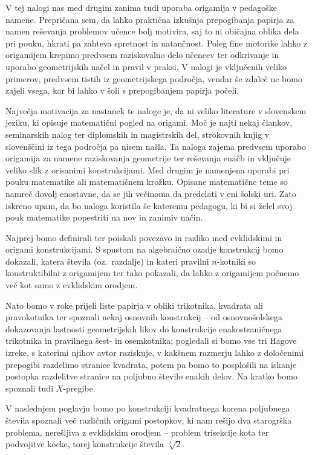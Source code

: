 V tej nalogi nas med drugim zanima tudi uporaba origamija v pedagoške namene. Prepričana sem, da lahko praktična izkušnja prepogibanja papirja za namen reševanja problemov učence bolj motivira, saj to ni običajna oblika dela pri pouku, hkrati pa zahteva spretnost in natančnost. Poleg fine motorike lahko z origamijem krepimo predvsem raziskovalno delo učencev ter odkrivanje in uporabo geometrijskih načel in pravil v praksi. V nalogi je vključenih veliko primerov, predvsem tistih iz geometrijskega področja, vendar še zdaleč ne bomo zajeli vsega, kar bi lahko v šoli s prepogibanjem papirja počeli.

Največja motivacija za nastanek te naloge je, da ni veliko literature v slovenskem jeziku, ki opisuje matematični pogled na origami. Moč je najti nekaj člankov, seminarskih nalog ter diplomskih in magistrskih del, strokovnih knjig v slovenščini iz tega področja pa nisem našla. Ta naloga zajema predvsem uporabo origamija za namene raziskovanja geometrije ter reševanja enačb in vključuje veliko slik z orisanimi konstrukcijami. Med drugim je namenjena uporabi pri pouku matematike ali matematičnem krožku. Opisane matematične teme so namreč dovolj enostavne, da se jih večinoma da predelati v eni šolski uri. Zato iskreno upam, da bo naloga koristila še kateremu pedagogu, ki bi si želel svoj pouk matematike popestriti na nov in zanimiv način.

Najprej bomo definirali ter poiskali povezavo in razliko med evklidskimi in origami konstrukcijami. S spustom na algebraično ozadje konstrukcij bomo dokazali, katera števila (oz.\ razdalje) in kateri pravilni $n$-kotniki so konstruktibilni z origamijem ter tako pokazali, da lahko z origamijem počnemo več kot samo z evklidskim orodjem.

Nato bomo v roke prijeli liste papirja v obliki trikotnika, kvadrata ali pravokotnika ter spoznali nekaj osnovnih konstrukcij -- od osnovnošolskega dokazovanja lastnosti geometrijskih likov do konstrukcije enakostraničnega trikotnika in pravilnega šest- in osemkotnika; pogledali si bomo vse tri Hagove izreke, s katerimi njihov avtor raziskuje, v kakšnem razmerju lahko z določenimi prepogibi razdelimo stranice kvadrata, potem pa bomo to posplošili na iskanje postopka razdelitve stranice na poljubno število enakih delov. Na kratko bomo spoznali tudi $X$-pregibe.

V naslednjem poglavju bomo po konstrukciji kvadratnega korena poljubnega števila spoznali več različnih origami postopkov, ki nam rešijo dva starogrška problema, nerešljiva z evklidskim orodjem -- problem trisekcije kota ter podvojitve kocke, torej konstrukcije števila $\sqrt[3]{2}$.

